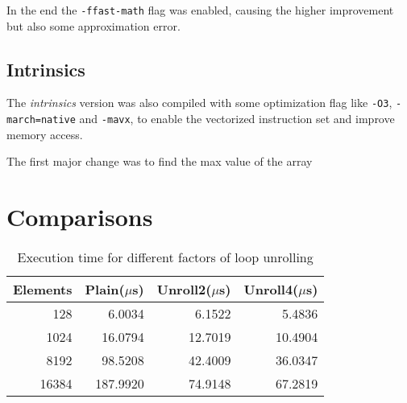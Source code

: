 \documentclass[12pt, a4paper]{article}
\begin{document}
In the end the \verb|-ffast-math| flag was enabled, causing the higher
improvement but also some approximation error.

\subsection{Intrinsics}

The \textit{intrinsics} version was also compiled with some optimization flag
like \verb|-O3|, \verb|-march=native| and \verb|-mavx|, to enable the vectorized
instruction set and improve memory access.

The first major change was to find the max value of the array

\section{Comparisons}

\begin{table}[H]
	\centering
	\begin{tabular}{rrrr}
		\toprule
		Elements & Plain($\mu$s) & Unroll2($\mu$s) & Unroll4($\mu$s) \\
		\midrule
		128      & 6.0034        & 6.1522          & 5.4836          \\
		1024     & 16.0794       & 12.7019         & 10.4904         \\
		8192     & 98.5208       & 42.4009         & 36.0347         \\
		16384    & 187.9920      & 74.9148         & 67.2819         \\
		\bottomrule
	\end{tabular}
	\caption{Execution time for different factors of loop unrolling}
\end{table}
\end{document}
